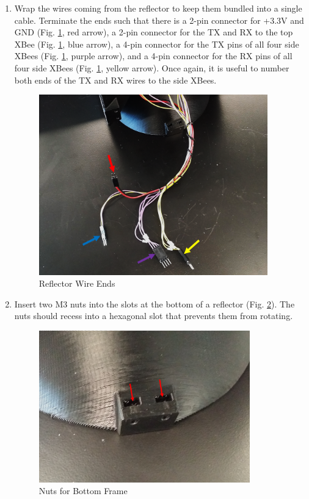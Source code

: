 \begin{enumerate}[label = \textbf{Step \arabic*.}]
    \item Wrap the wires coming from the reflector to keep them bundled into a single cable. Terminate the ends such that there is a 2-pin connector for +3.3V and GND (Fig. \ref{fig:reflectorWires}, red arrow), a 2-pin connector for the TX and RX to the top XBee (Fig. \ref{fig:reflectorWires}, blue arrow), a 4-pin connector for the TX pins of all four side XBees (Fig. \ref{fig:reflectorWires}, purple arrow), and a 4-pin connector for the RX pins of all four side XBees (Fig. \ref{fig:reflectorWires}, yellow arrow). Once again, it is useful to number both ends of the TX and RX wires to the side XBees.
    \begin{figure}[H]
        \centering
        \includegraphics[width=3.9in]{figs/img/assembly/23-reflectorWireEnds.png}
        \caption{Reflector Wire Ends}
        \label{fig:reflectorWires}
    \end{figure}
    \pagebreak

    \item Insert two M3 nuts into the slots at the bottom of a reflector (Fig. \ref{fig:bottomNuts}). The nuts should recess into a hexagonal slot that prevents them from rotating.
    \begin{figure}[H]
        \centering
        \includegraphics[width=3.6in]{figs/img/assembly/24-reflectorBottomNuts.png}
        \caption{Nuts for Bottom Frame}
        \label{fig:bottomNuts}
    \end{figure}


\end{enumerate}
